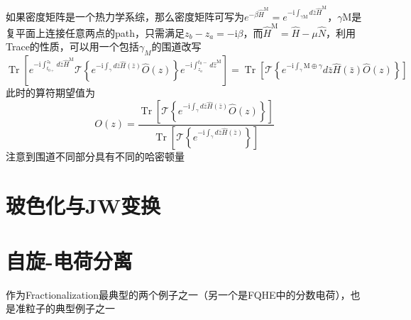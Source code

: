 \documentclass[10pt,openany]{book}
\theoremstyle{thmstyle} %
\theoremstyle{defstyle} %
\theoremstyle{prostyle} %
\begin{document}
如果密度矩阵是一个热力学系综，那么密度矩阵可写为$ e^{-\beta \hat{H}^{\mathrm{M}}}=e^{-\mathrm{i} \int_{\gamma \mathrm{M}} d \bar{z} \hat{H}^{\mathrm{M}}} $，$ \gamma \mathrm{M} $是复平面上连接任意两点的path，只需满足$ z_b-z_a=-\mathrm{i} \beta $，而$ \hat{H}^{\mathrm{M}}=\hat{H}-\mu \hat{N} $，利用Trace的性质，可以用一个包括$ \gamma_M  $的围道改写
\begin{equation}
  \operatorname{Tr}\left[e^{-\mathrm{i} \int_{t_{0+}}^{z_b} d \bar{z} \hat{H}^{\mathrm{M}}} \mathcal{T}\left\{e^{-\mathrm{i} \int_\gamma d \bar{z} \hat{H}(\bar{z})} \hat{O}(z)\right\} e^{-\mathrm{i} \int_{z_a}^{t_0-} d \hat{z}^{\mathrm{M}}}\right]=\operatorname{Tr}\left[\mathcal{T}\left\{e^{-\mathrm{i} \int_\gamma \mathrm{M} \oplus \gamma} d \bar{z} \hat{H}(\bar{z}) \hat{O}(z)\right\}\right]
\end{equation}    
此时的算符期望值为
\begin{equation*}
  O(z)=\frac{\operatorname{Tr}\left[\mathcal{T}\left\{e^{-\mathrm{i} \int_\gamma d \bar{z} \hat{H}(\bar{z})} \hat{O}(z)\right\}\right]}{\operatorname{Tr}\left[\mathcal{T}\left\{e^{-\mathrm{i} \int_\gamma d \bar{z} \hat{H}(\bar{z})}\right\}\right]}
\end{equation*}
注意到围道不同部分具有不同的哈密顿量
\section{玻色化与JW变换}
\section{自旋-电荷分离}
作为Fractionalization最典型的两个例子之一（另一个是FQHE中的分数电荷），也是准粒子的典型例子之一
\end{document}

